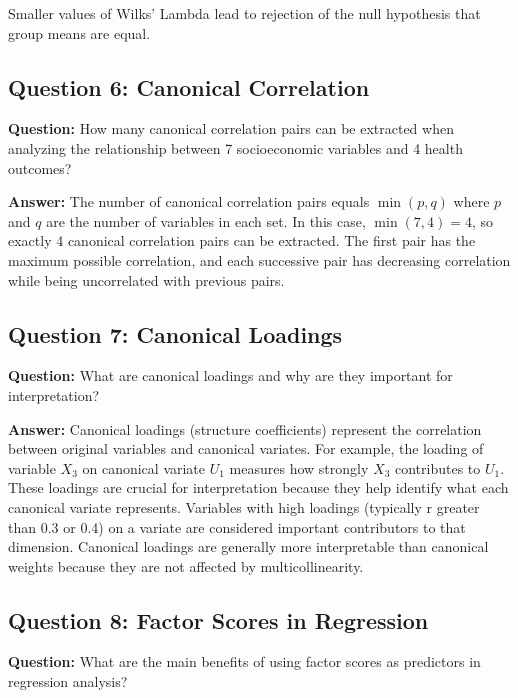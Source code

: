 \documentclass[
]{article}
\begin{document}
Smaller values of Wilks' Lambda lead to rejection of the null hypothesis
that group means are equal.

\textbf{ }

\subsection{Question 6: Canonical Correlation}

\textbf{Question:} How many canonical correlation pairs can be extracted
when analyzing the relationship between 7 socioeconomic variables and 4
health outcomes?

\textbf{Answer:} The number of canonical correlation pairs equals
\(\min(p,q)\) where \(p\) and \(q\) are the number of variables in each
set. In this case, \(\min(7,4) = 4\), so exactly 4 canonical correlation
pairs can be extracted. The first pair has the maximum possible
correlation, and each successive pair has decreasing correlation while
being uncorrelated with previous pairs.

\textbf{ }

\subsection{Question 7: Canonical Loadings}

\textbf{Question:} What are canonical loadings and why are they
important for interpretation?

\textbf{Answer:} Canonical loadings (structure coefficients) represent
the correlation between original variables and canonical variates. For
example, the loading of variable \(X_{3}\) on canonical variate
\(U_{1}\) measures how strongly \(X_{3}\) contributes to \(U_{1}\).
These loadings are crucial for interpretation because they help identify
what each canonical variate represents. Variables with high loadings
(typically \textbar r\textbar{} greater than 0.3 or 0.4) on a variate
are considered important contributors to that dimension. Canonical
loadings are generally more interpretable than canonical weights because
they are not affected by multicollinearity.

\textbf{ }

\subsection{Question 8: Factor Scores in Regression}

\textbf{Question:} What are the main benefits of using factor scores as
predictors in regression analysis?
\end{document}

